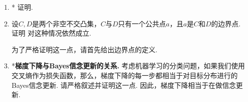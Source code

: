 \begin{enumerate}[wide, labelindent=0pt]
    \item *\label{exercise:Chebyshev-convex} 证明.
    
    \item \label{exercise:separation-hyperplane-extension} 设$C,D$是两个非空不交凸集，$C$与$D$只有一个公共点$a$，且$a$是$C$和$D$的边界点. 证明 对这种情况依然成立.
    \begin{hint}
        为了严格证明这一点，请首先给出边界点的定义.
    \end{hint}
    
    \item *\textbf{梯度下降与Bayes信念更新的关系. }考虑机器学习的分类问题，如果我们使用交叉熵作为损失函数，那么，梯度下降的每一步都相当于对目标分布进行的Bayes信念更新. 请严格叙述并证明这一点. 因此，梯度下降相当于在做信念更新. 
\end{enumerate}
